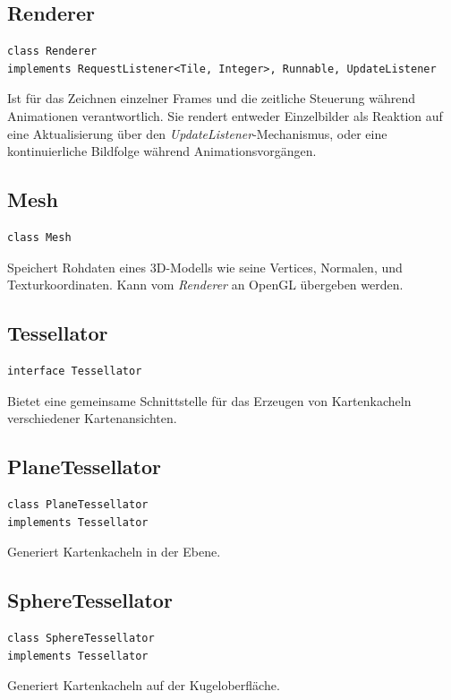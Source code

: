 \documentclass[10pt]{scrreprt}
\begin{document}
\subsection*{Renderer}
\begin{lstlisting}
class Renderer
implements RequestListener<Tile, Integer>, Runnable, UpdateListener
\end{lstlisting}
Ist für das Zeichnen einzelner Frames und die zeitliche Steuerung während Animationen verantwortlich. Sie rendert entweder Einzelbilder als Reaktion auf eine Aktualisierung über den \textit{UpdateListener}-Mechanismus, oder eine kontinuierliche Bildfolge während Animationsvorgängen.\\

\subsection*{Mesh}
\begin{lstlisting}
class Mesh
\end{lstlisting}
Speichert Rohdaten eines 3D-Modells wie seine Vertices, Normalen, und Texturkoordinaten. Kann vom \textit{Renderer} an OpenGL übergeben werden.\\

\subsection*{Tessellator}
\begin{lstlisting}
interface Tessellator
\end{lstlisting}
Bietet eine gemeinsame Schnittstelle für das Erzeugen von Kartenkacheln verschiedener Kartenansichten.\\

\subsection*{PlaneTessellator}
\begin{lstlisting}
class PlaneTessellator
implements Tessellator
\end{lstlisting}
Generiert Kartenkacheln in der Ebene.\\

\subsection*{SphereTessellator}
\begin{lstlisting}
class SphereTessellator
implements Tessellator
\end{lstlisting}
Generiert Kartenkacheln auf der Kugeloberfläche.\\
\end{document}
